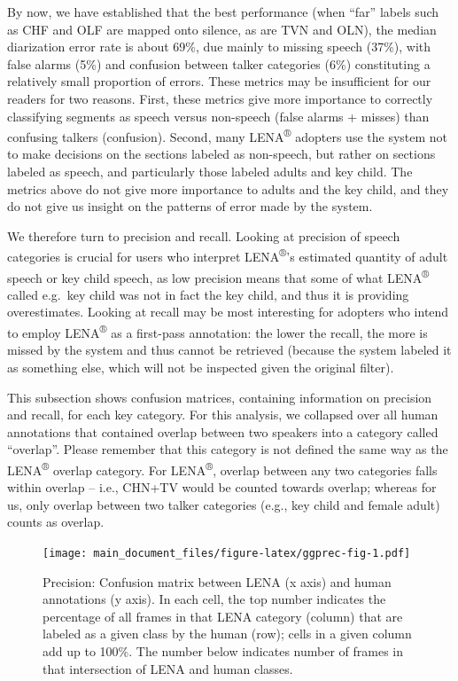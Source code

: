 \documentclass[english,floatsintext,man]{apa6}
\begin{document}
By now, we have established that the best performance (when
\enquote{far} labels such as CHF and OLF are mapped onto silence, as are
TVN and OLN), the median diarization error rate is about 69\%, due
mainly to missing speech (37\%), with false alarms (5\%) and confusion
between talker categories (6\%) constituting a relatively small
proportion of errors. These metrics may be insufficient for our readers
for two reasons. First, these metrics give more importance to correctly
classifying segments as speech versus non-speech (false alarms + misses)
than confusing talkers (confusion). Second, many LENA\textsuperscript{®}
adopters use the system not to make decisions on the sections labeled as
non-speech, but rather on sections labeled as speech, and particularly
those labeled adults and key child. The metrics above do not give more
importance to adults and the key child, and they do not give us insight
on the patterns of error made by the system.

We therefore turn to precision and recall. Looking at precision of
speech categories is crucial for users who interpret
LENA\textsuperscript{®}'s estimated quantity of adult speech or key
child speech, as low precision means that some of what
LENA\textsuperscript{®} called e.g.~key child was not in fact the key
child, and thus it is providing overestimates. Looking at recall may be
most interesting for adopters who intend to employ
LENA\textsuperscript{®} as a first-pass annotation: the lower the
recall, the more is missed by the system and thus cannot be retrieved
(because the system labeled it as something else, which will not be
inspected given the original filter).

This subsection shows confusion matrices, containing information on
precision and recall, for each key category. For this analysis, we
collapsed over all human annotations that contained overlap between two
speakers into a category called \enquote{overlap}. Please remember that
this category is not defined the same way as the LENA\textsuperscript{®}
overlap category. For LENA\textsuperscript{®}, overlap between any two
categories falls within overlap -- i.e., CHN+TV would be counted towards
overlap; whereas for us, only overlap between two talker categories
(e.g., key child and female adult) counts as overlap.

\begin{figure}
\centering
\texttt{[image: main\_document\_files/figure-latex/ggprec-fig-1.pdf]}
\caption{\label{fig:ggprec-fig}Precision: Confusion matrix between LENA (x
axis) and human annotations (y axis). In each cell, the top number
indicates the percentage of all frames in that LENA category (column)
that are labeled as a given class by the human (row); cells in a given
column add up to 100\%. The number below indicates number of frames in
that intersection of LENA and human classes.}
\end{figure}
\end{document}
